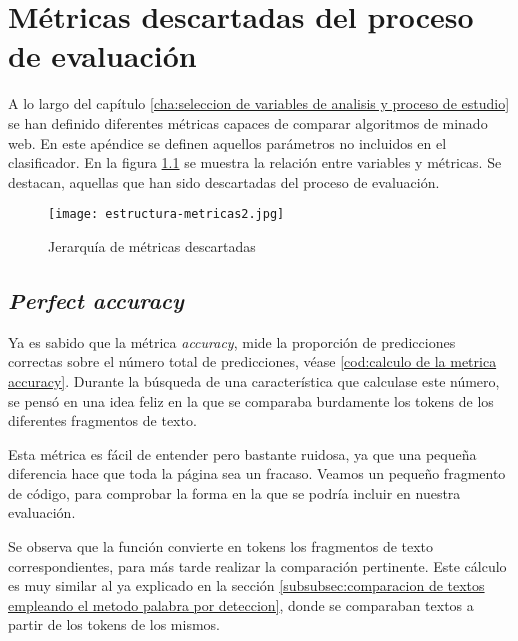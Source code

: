 \chapter{Métricas descartadas del proceso de evaluación}
\label{cha:metricas descartadas del proceso de evaluacion}

A lo largo del capítulo \ref{cha:seleccion de variables de analisis y proceso de estudio} se han definido
diferentes métricas capaces de comparar algoritmos de minado web. En este apéndice se definen aquellos
parámetros no incluidos en el clasificador. En la figura \ref{img:jerarquia de metricas descartadas} se 
muestra la relación entre variables y métricas. Se destacan, aquellas que han sido descartadas del proceso 
de evaluación.

\begin{figure}[tphb]
    \centering
    \texttt{[image: estructura-metricas2.jpg]}
    \caption{Jerarquía de métricas descartadas}
    \label{img:jerarquia de metricas descartadas}
\end{figure}

\section{\emph{Perfect accuracy}}
\label{sec:perfect accuracy}

Ya es sabido que la métrica \emph{accuracy}, mide la proporción de predicciones correctas sobre el número
total de predicciones, véase \ref{cod:calculo de la metrica accuracy}. Durante la búsqueda de una
característica que calculase este número, se pensó en una idea feliz en la que se comparaba
burdamente los tokens de los diferentes fragmentos de texto.

Esta métrica es fácil de entender pero bastante ruidosa, ya que una pequeña diferencia hace que toda la
página sea un fracaso. Veamos un pequeño fragmento de código, para comprobar la forma en la que se podría
incluir en nuestra evaluación.

\begin{codefloat}
    
    \caption{Cálculo de la métrica \emph{perfect accuracy}}
    \label{cod:calculo de la metrica perfect accuracy}
\end{codefloat}

Se observa que la función convierte en tokens los fragmentos de texto correspondientes, para más tarde 
realizar la comparación pertinente. Este cálculo es muy similar al ya explicado en la sección 
\ref{subsubsec:comparacion de textos empleando el metodo palabra por deteccion}, donde se  comparaban 
textos a partir de los tokens de los mismos.

